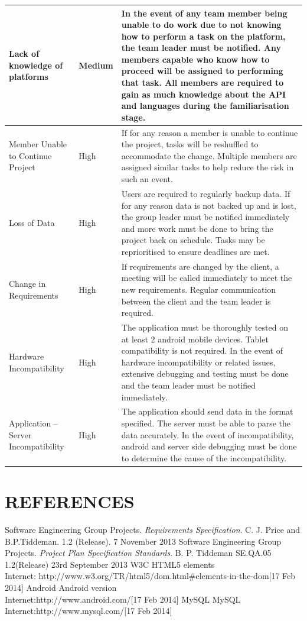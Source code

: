 \documentclass[12pt]{article}
\begin{document}
\begin{longtable}{|p{2.5cm}|p{1.5cm}|p{10cm}|}
\hline 
	Lack of knowledge of platforms & Medium & In the event of any team member being unable to do work due to not knowing how to perform a task on the platform, the team leader must be notified. Any members capable who know how to proceed will be assigned to performing that task. All members are required to gain as much knowledge about the API and languages during the familiarisation stage. \\
\hline 
	Member Unable to Continue Project & High & If for any reason a member is unable to continue the project, tasks will be reshuffled to accommodate the change. Multiple members are assigned similar tasks to help reduce the risk in such an event. \\
\hline
	Loss of Data & High & Users are required to regularly backup data. If for any reason data is not backed up and is lost, the group leader must be notified immediately and more work must be done to bring the project back on schedule. Tasks may be reprioritised to ensure deadlines are met. \\
\hline 
	Change in Requirements & High & If requirements are changed by the client, a meeting will be called immediately to meet the new requirements. Regular communication between the client and the team leader is required. \\
\hline 
	Hardware Incompatibility & High & The application must be thoroughly tested on at least 2 android mobile devices. Tablet compatibility is not required. In the event of hardware incompatibility or related issues, extensive debugging and testing must be done and the team leader must be notified immediately. \\ 
\hline 
	Application – Server Incompatibility & High & The application should send data in the format specified. The server must be able to parse the data accurately. In the event of incompatibility, android and server side debugging must be done to determine the cause of the incompatibility. \\
\hline
\end{longtable}
\newpage
\section{REFERENCES}
\begin{thebibliography}{0}
Software Engineering Group Projects.
\emph{Requirements Specification}.
C. J. Price and B.P.Tiddeman. 1.2 (Release). 7 November 2013
Software Engineering Group Projects.
\emph{Project Plan Specification Standards}.
B. P. Tiddeman SE.QA.05  1.2(Release) 23rd September 2013
W3C HTML5 elements ~\\Internet: http://www.w3.org/TR/html5/dom.html\#elements-in-the-dom[17 Feb 2014]
Android Android version ~\\
Internet:http://www.android.com/[17 Feb 2014]
MySQL MySQL  Internet:http://www.mysql.com/[17 Feb 2014]
\end{thebibliography}
\newpage
\end{document}
